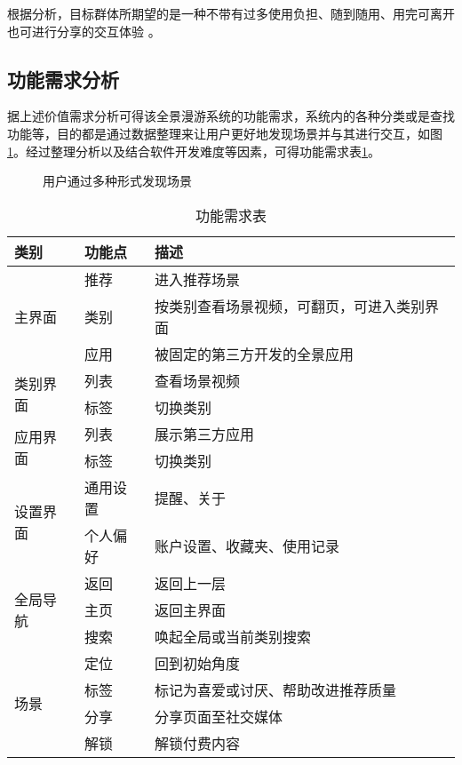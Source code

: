 根据分析，目标群体所期望的是一种不带有过多使用负担、随到随用、用完可离开也可进行分享的交互体验
。

\subsection{功能需求分析}
据上述价值需求分析可得该全景漫游系统的功能需求，系统内的各种分类或是查找功能等，目的都是通过数据整理来让用户更好地发现场景并与其进行交互，如图\ref{fig:interaction}。经过整理分析以及结合软件开发难度等因素，可得功能需求表\ref{tab:func}。

\begin{figure}[htp]
\centering
{}
\caption{用户通过多种形式发现场景}
\label{fig:interaction}
\end{figure}


\begin{table}[htp]
\centering
\caption{功能需求表}
\vskip 5pt
\begin{tabular}{lll}
\toprule
类别 & 功能点 & 描述 \\
\midrule
\multirow{3}{*}{主界面} & 推荐 & 进入推荐场景 \\
& 类别 & 按类别查看场景视频，可翻页，可进入类别界面 \\
& 应用 & 被固定的第三方开发的全景应用 \\
\midrule
\multirow{2}{*}{类别界面} & 列表 & 查看场景视频 \\
& 标签 & 切换类别 \\
\midrule
\multirow{2}{*}{应用界面} & 列表 & 展示第三方应用 \\
& 标签 & 切换类别 \\
\midrule
\multirow{2}{*}{设置界面} & 通用设置 & 提醒、关于 \\
& 个人偏好 & 账户设置、收藏夹、使用记录 \\
\midrule
\multirow{3}{*}{全局导航} & 返回 & 返回上一层 \\
& 主页 & 返回主界面 \\
& 搜索 & 唤起全局或当前类别搜索 \\
\midrule
\multirow{4}{*}{场景} & 定位 & 回到初始角度 \\
& 标签 & 标记为喜爱或讨厌、帮助改进推荐质量 \\
& 分享 & 分享页面至社交媒体 \\
& 解锁 & 解锁付费内容 \\
\bottomrule
\end{tabular}
\label{tab:func}
\end{table}

